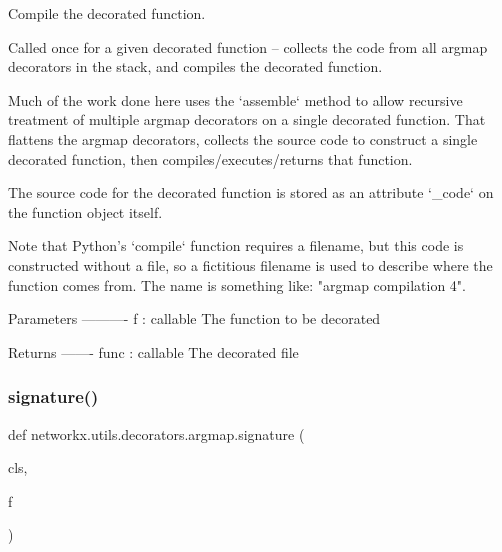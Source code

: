 \begin{DoxyVerb}Compile the decorated function.

Called once for a given decorated function -- collects the code from all
argmap decorators in the stack, and compiles the decorated function.

Much of the work done here uses the `assemble` method to allow recursive
treatment of multiple argmap decorators on a single decorated function.
That flattens the argmap decorators, collects the source code to construct
a single decorated function, then compiles/executes/returns that function.

The source code for the decorated function is stored as an attribute
`_code` on the function object itself.

Note that Python's `compile` function requires a filename, but this
code is constructed without a file, so a fictitious filename is used
to describe where the function comes from. The name is something like:
"argmap compilation 4".

Parameters
----------
f : callable
    The function to be decorated

Returns
-------
func : callable
    The decorated file\end{DoxyVerb}
 \mbox{\label{classnetworkx_1_1utils_1_1decorators_1_1argmap_a336d69c01afde4f38cab25eaf8df929c}} 
\subsubsection{\texorpdfstring{signature()}{signature()}}
{\footnotesize\ttfamily def networkx.\+utils.\+decorators.\+argmap.\+signature (\begin{DoxyParamCaption}\item[{}]{cls,  }\item[{}]{f }\end{DoxyParamCaption})}

